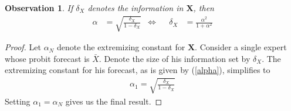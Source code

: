\documentclass[11pt,twoside]{article}
\newtheorem{observation}[theorem]{Observation}
\begin{document}
\begin{observation}
\label{infoObservation}
If $\delta_X$ denotes the information in $\boldsymbol{X}$, then 
\begin{align*}
\alpha &= \sqrt{\frac{\delta_X}{1-\delta_X}} &\Leftrightarrow&& \delta_X &=\frac{\alpha^{2}}{1+\alpha^{2}}
\end{align*}
\end{observation}
\begin{proof}
Let $\alpha_N$ denote the extremizing constant for $\boldsymbol{X}$. Consider a single expert whose probit forecast is $\bar{X}$. Denote the size of his information set by $\delta_X$. The extremizing constant for his forecast, as is given by (\ref{alpha}), simplifies to
\begin{align*}
\alpha_1  =  \sqrt{\frac{\delta_X}{1-\delta_X}} 
\end{align*}
Setting $\alpha_1 = \alpha_N$ gives us the final result.

\end{proof}
\end{document}
